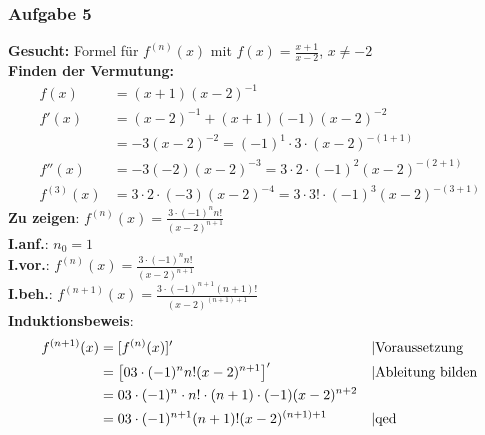 \subsubsection{Aufgabe 5}
\textbf{Gesucht:} Formel für $ f^{(n)}(x) $ mit $ f(x)=\frac{x+1}{x-2} $, $x\neq-2$ \\
\textbf{Finden der Vermutung:}\begin{align*}
f(x) &= (x+1)(x-2)^{-1}\\
f'(x) &= (x-2)^{-1} + (x+1)(-1)(x-2)^{-2} \\&= -3(x-2)^{-2} = (-1)^1\cdot3\cdot(x-2)^{-(1+1)}\\
f''(x)&= -3(-2)(x-2)^{-3}= 3\cdot2\cdot(-1)^2(x-2)^{-(2+1)}\\
f^{(3)}(x)&= 3\cdot2\cdot(-3)(x-2)^{-4} = 3\cdot 3!\cdot(-1)^3(x-2)^{-(3+1)}\end{align*}
\textbf{Zu zeigen}: $ f^{(n)}(x) = \frac{3\cdot(-1)^n n!}{(x-2)^{n+1}} $\\
\textbf{I.anf.}: $ n_0 = 1 $\\
\textbf{I.vor.}: $ f^{(n)}(x) = \frac{3\cdot(-1)^n n!}{(x-2)^{n+1}} $\\
\textbf{I.beh.}: $ f^{(n+1)}(x) = \frac{3\cdot(-1)^{n+1} (n+1)!}{(x-2)^{(n+1)+1}} $\\
\textbf{Induktionsbeweis}:\begin{align*}
f^{(n+1)}(x) &= [f^{(n)}(x)]' && \text{\textbar Voraussetzung}\\
						 &= \left[\frac{3\cdot(-1)^n n!}{(x-2)^{n+1}}\right]' && \text{\textbar Ableitung bilden}\\
						 &= \frac{3\cdot(-1)^n\cdot n!\cdot(n+1)\cdot(-1)}{(x-2)^{n+2}}\\
						 &= \frac{3\cdot(-1)^{n+1}(n+1)!}{(x-2)^{(n+1)+1}}&& \text{\textbar qed}
\end{align*}
